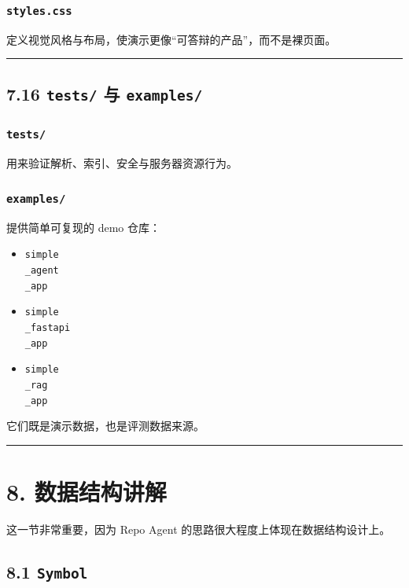 \documentclass[UTF8,12pt,openany]{ctexbook}
\begin{document}
\subsubsection{\texttt{styles.css}}

定义视觉风格与布局，使演示更像“可答辩的产品”，而不是裸页面。\par

\hrule

\subsection{7.16 \texttt{tests/} 与 \texttt{examples/}}

\subsubsection{\texttt{tests/}}

用来验证解析、索引、安全与服务器资源行为。\par

\subsubsection{\texttt{examples/}}

提供简单可复现的 demo 仓库：\par

\begin{itemize}
\item \texttt{simple\\_agent\\_app}
\item \texttt{simple\\_fastapi\\_app}
\item \texttt{simple\\_rag\\_app}
\end{itemize}

它们既是演示数据，也是评测数据来源。\par

\hrule

\section{8. 数据结构讲解}

这一节非常重要，因为 Repo Agent 的思路很大程度上体现在数据结构设计上。\par

\subsection{8.1 \texttt{Symbol}}
\end{document}
